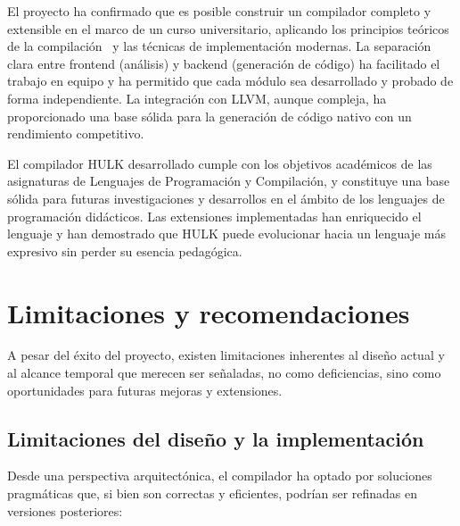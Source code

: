 \documentclass[12pt, a4paper]{article}
\begin{document}
El proyecto ha confirmado que es posible construir un compilador completo y extensible en el marco de un curso universitario, aplicando los principios teóricos de la compilación~\cite{aho1986} y las técnicas de implementación modernas. La separación clara entre frontend (análisis) y backend (generación de código) ha facilitado el trabajo en equipo y ha permitido que cada módulo sea desarrollado y probado de forma independiente. La integración con LLVM, aunque compleja, ha proporcionado una base sólida para la generación de código nativo con un rendimiento competitivo.

El compilador HULK desarrollado cumple con los objetivos académicos de las asignaturas de Lenguajes de Programación y Compilación, y constituye una base sólida para futuras investigaciones y desarrollos en el ámbito de los lenguajes de programación didácticos. Las extensiones implementadas han enriquecido el lenguaje y han demostrado que HULK puede evolucionar hacia un lenguaje más expresivo sin perder su esencia pedagógica.

\newpage


\section{Limitaciones y recomendaciones}
\label{sec:limitaciones}

A pesar del éxito del proyecto, existen limitaciones inherentes al diseño actual y al alcance temporal que merecen ser señaladas, no como deficiencias, sino como oportunidades para futuras mejoras y extensiones.

\subsection{Limitaciones del diseño y la implementación}

Desde una perspectiva arquitectónica, el compilador ha optado por soluciones pragmáticas que, si bien son correctas y eficientes, podrían ser refinadas en versiones posteriores:
\end{document}
